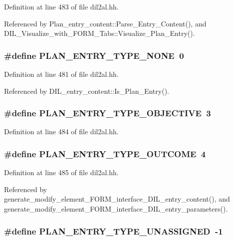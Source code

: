 Definition at line 483 of file dil2al.hh.

Referenced by Plan\_\-entry\_\-content::Parse\_\-Entry\_\-Content(), and DIL\_\-Visualize\_\-with\_\-FORM\_\-Tabs::Visualize\_\-Plan\_\-Entry().
\subsubsection{\setlength{\rightskip}{0pt plus 5cm}\#define PLAN\_\-ENTRY\_\-TYPE\_\-NONE\ 0}\label{dil2al_8hh_a10}




Definition at line 481 of file dil2al.hh.

Referenced by DIL\_\-entry\_\-content::Is\_\-Plan\_\-Entry().
\subsubsection{\setlength{\rightskip}{0pt plus 5cm}\#define PLAN\_\-ENTRY\_\-TYPE\_\-OBJECTIVE\ 3}\label{dil2al_8hh_a13}




Definition at line 484 of file dil2al.hh.
\subsubsection{\setlength{\rightskip}{0pt plus 5cm}\#define PLAN\_\-ENTRY\_\-TYPE\_\-OUTCOME\ 4}\label{dil2al_8hh_a14}




Definition at line 485 of file dil2al.hh.

Referenced by generate\_\-modify\_\-element\_\-FORM\_\-interface\_\-DIL\_\-entry\_\-content(), and generate\_\-modify\_\-element\_\-FORM\_\-interface\_\-DIL\_\-entry\_\-parameters().
\subsubsection{\setlength{\rightskip}{0pt plus 5cm}\#define PLAN\_\-ENTRY\_\-TYPE\_\-UNASSIGNED\ -1}\label{dil2al_8hh_a9}





